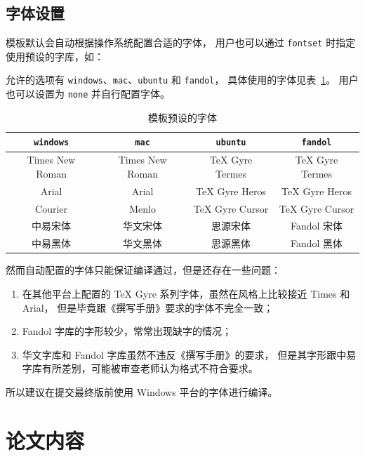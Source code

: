 \documentclass[a4paper]{ltxdoc}
\makeatletter
\DeclareRobustCommand\opt{\texttt}
\def\DescribeOption{\leavevmode\@bsphack\begingroup\MakePrivateLetters
  \Describe@Option}
\def\Describe@Option#1{\endgroup
              \marginpar{\raggedleft\PrintDescribeOption{#1}}%
              \SpecialEnvIndex{#1}\@esphack\ignorespaces}
\makeatother
\begin{document}
\subsection{字体设置}
模板默认会自动根据操作系统配置合适的字体，
\DescribeOption{fontset}
用户也可以通过 \opt{fontset} 时指定使用预设的字库，如：
允许的选项有 \opt{windows}、\opt{mac}、\opt{ubuntu} 和 \opt{fandol}，
具体使用的字体见表~\ref{tab:fontset}。
用户也可以设置为 \opt{none} 并自行配置字体。

\begin{table}
  \centering
  \caption{模板预设的字体}
  \label{tab:fontset}
  \begin{tabular}{cccc}
    \toprule
    \opt{windows} & \opt{mac}    & \opt{ubuntu} & \opt{fandol} \\
    \midrule
    Times New Roman  & Times New Roman & TeX Gyre Termes & TeX Gyre Termes \\
    Arial            & Arial           & TeX Gyre Heros  & TeX Gyre Heros  \\
    Courier          & Menlo           & TeX Gyre Cursor & TeX Gyre Cursor \\
    中易宋体         & 华文宋体        & 思源宋体        & Fandol 宋体     \\
    中易黑体         & 华文黑体        & 思源黑体        & Fandol 黑体     \\
    \bottomrule
  \end{tabular}
\end{table}

然而自动配置的字体只能保证编译通过，但是还存在一些问题：
\begin{enumerate}
  \item 在其他平台上配置的 TeX Gyre 系列字体，虽然在风格上比较接近 Times 和 Arial，
    但是毕竟跟《撰写手册》要求的字体不完全一致；
  \item Fandol 字库的字形较少，常常出现缺字的情况；
  \item 华文字库和 Fandol 字库虽然不违反《撰写手册》的要求，
    但是其字形跟中易字库有所差别，可能被审查老师认为格式不符合要求。
\end{enumerate}

所以建议在提交最终版前使用 Windows 平台的字体进行编译。



\section{论文内容}
\end{document}
